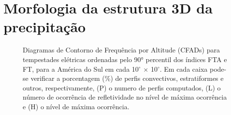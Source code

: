 \chapter{Morfologia da estrutura 3D da precipitação}

\begin{figure}
  \caption{Diagramas de Contorno de Frequência por Altitude (CFADs) para tempestades elétricas ordenadas pelo 90° percentil dos índices FTA e FT, para a América do Sul em cada 10$^{\circ}$  $\times$ 10$^{\circ}$. Em cada caixa pode-se verificar a porcentagem (\%) de perfis convectivos, estratiformes e outros, respectivamente, (P) o numero de perfis computados, (L) o número de ocorrência de refletividade no nível de máxima ocorrência e (H) o nível de máxima ocorrência.}
\label{cfadstotal}
\end{figure} 

